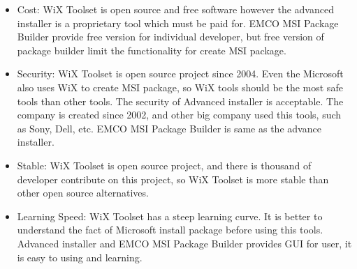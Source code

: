 	\begin{itemize}
		\item {
       Cost: WiX Toolset is open source and free software however the advanced installer is a proprietary tool which must be paid for.
       EMCO MSI Package Builder provide free version for individual developer, but free version of package builder limit the functionality for create MSI package.
    }
		\item {
       Security: WiX Toolset is open source project since 2004.
       Even the Microsoft also uses WiX to create MSI package, so WiX tools should be the most safe tools than other tools.
       The security of Advanced installer is acceptable.
       The company is created since 2002, and other big company used this tools, such as Sony, Dell, etc.
       EMCO MSI Package Builder is same as the advance installer.
    }
		\item {
      Stable: WiX Toolset is open source project, and there is thousand of developer contribute on this project, so WiX Toolset is more stable than other open source alternatives.
    }
		\item {
      Learning Speed: WiX Toolset has a steep learning curve.
      It is better to understand the fact of Microsoft install package before using this tools.
      Advanced installer and EMCO MSI Package Builder provides GUI for user, it is easy to using and learning.
    }
	\end{itemize}
	

